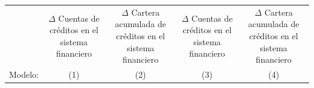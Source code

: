 \begingroup
\centering
\begin{tabular}{lcccc}
   \tabularnewline \midrule \midrule
                                             & \makecell{$\Delta$ Cuentas de créditos \\ en el sistema financiero}     & \makecell{$\Delta$ Cartera acumulada de créditos \\ en el sistema financiero}     & \makecell{$\Delta$ Cuentas de créditos \\ en el sistema financiero}     & \makecell{$\Delta$ Cartera acumulada de créditos \\ en el sistema financiero}\\      
   Modelo:                                                       & (1)                                                                     & (2)                                                                               & (3)                                                                     & (4)\\  
   \midrule
 

\end{tabular}
